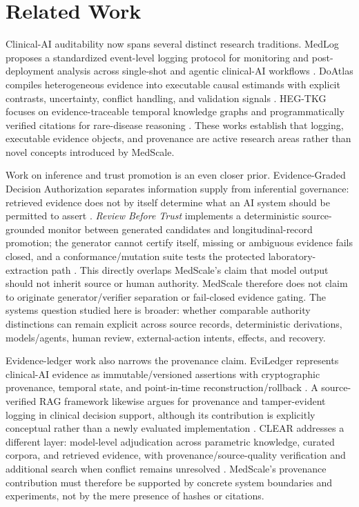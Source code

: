\section{Related Work}

Clinical-AI auditability now spans several distinct research traditions. MedLog proposes a standardized event-level logging protocol for monitoring and post-deployment analysis across single-shot and agentic clinical-AI workflows \citep{Noori.2025}. DoAtlas compiles heterogeneous evidence into executable causal estimands with explicit contrasts, uncertainty, conflict handling, and validation signals \citep{Li.2026}. HEG-TKG focuses on evidence-traceable temporal knowledge graphs and programmatically verified citations for rare-disease reasoning \citep{Ahmed.2026}. These works establish that logging, executable evidence objects, and provenance are active research areas rather than novel concepts introduced by MedScale.

Work on inference and trust promotion is an even closer prior. Evidence-Graded Decision Authorization separates information supply from inferential governance: retrieved evidence does not by itself determine what an AI system should be permitted to assert \citep{Lin.2026}. \emph{Review Before Trust} implements a deterministic source-grounded monitor between generated candidates and longitudinal-record promotion; the generator cannot certify itself, missing or ambiguous evidence fails closed, and a conformance/mutation suite tests the protected laboratory-extraction path \citep{Girda.2026}. This directly overlaps MedScale's claim that model output should not inherit source or human authority. MedScale therefore does not claim to originate generator/verifier separation or fail-closed evidence gating. The systems question studied here is broader: whether comparable authority distinctions can remain explicit across source records, deterministic derivations, models/agents, human review, external-action intents, effects, and recovery.

Evidence-ledger work also narrows the provenance claim. EviLedger represents clinical-AI evidence as immutable/versioned assertions with cryptographic provenance, temporal state, and point-in-time reconstruction/rollback \citep{LiEviLedger.2026}. A source-verified RAG framework likewise argues for provenance and tamper-evident logging in clinical decision support, although its contribution is explicitly conceptual rather than a newly evaluated implementation \citep{Alu.2026}. CLEAR addresses a different layer: model-level adjudication across parametric knowledge, curated corpora, and retrieved evidence, with provenance/source-quality verification and additional search when conflict remains unresolved \citep{Wang.2026}. MedScale's provenance contribution must therefore be supported by concrete system boundaries and experiments, not by the mere presence of hashes or citations.

